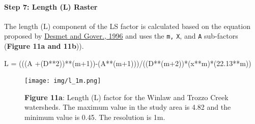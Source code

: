 \documentclass[
]{article}
\newenvironment{Shaded}{\begin{snugshade}}{\end{snugshade}}
\newcommand{\DecValTok}[1]{\textcolor[rgb]{0.00,0.00,0.81}{#1}}
\newcommand{\FloatTok}[1]{\textcolor[rgb]{0.00,0.00,0.81}{#1}}
\newcommand{\NormalTok}[1]{#1}
\newcommand{\OtherTok}[1]{\textcolor[rgb]{0.56,0.35,0.01}{#1}}
\newcommand{\SpecialCharTok}[1]{\textcolor[rgb]{0.00,0.00,0.00}{#1}}
\begin{document}
\hypertarget{sec-step-7-ls}{%
\paragraph*{Step 7: Length (L) Raster}\label{sec-step-7-ls}}

The length (L) component of the LS factor is calculated based on the equation proposed by \href{https://www.researchgate.net/publication/233425999_A_GIS_procedure_for_automatically_calculating_the_USLE_LS_factor_on_topographically_complex_landscape_units}{Desmet and Gover., 1996} and uses the \texttt{m,} \texttt{X}, and \texttt{A} sub-factors (\textbf{Figure 11a and 11b})).

\begin{Shaded}
\begin{Highlighting}[]
\NormalTok{L }\OtherTok{=}\NormalTok{ (((A }\SpecialCharTok{+}\NormalTok{(D}\SpecialCharTok{**}\DecValTok{2}\NormalTok{))}\SpecialCharTok{**}\NormalTok{(m}\SpecialCharTok{+}\DecValTok{1}\NormalTok{))}\SpecialCharTok{{-}}\NormalTok{(A}\SpecialCharTok{**}\NormalTok{(m}\SpecialCharTok{+}\DecValTok{1}\NormalTok{)))}\SpecialCharTok{/}\NormalTok{((D}\SpecialCharTok{**}\NormalTok{(m}\SpecialCharTok{+}\DecValTok{2}\NormalTok{))}\SpecialCharTok{*}\NormalTok{(x}\SpecialCharTok{**}\NormalTok{m)}\SpecialCharTok{*}\NormalTok{(}\FloatTok{22.13}\SpecialCharTok{**}\NormalTok{m))}
\end{Highlighting}
\end{Shaded}

\begin{figure}
\centering
\texttt{[image: img/l\_1m.png]}
\caption{\textbf{Figure 11a}: Length (L) factor for the Winlaw and Trozzo Creek watersheds. The maximum value in the study area is 4.82 and the minimum value is 0.45. The resolution is 1m.}
\end{figure}
\end{document}
